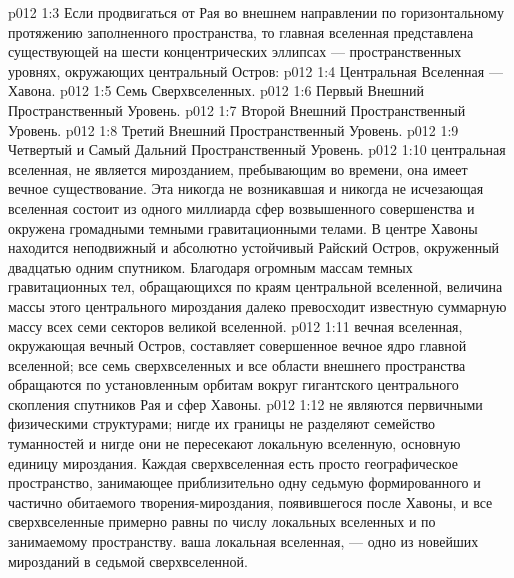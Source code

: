 \vs p012 1:3 \pc Если продвигаться от Рая во внешнем направлении по горизонтальному протяжению заполненного пространства, то главная вселенная представлена существующей на шести концентрических эллипсах --- пространственных уровнях, окружающих центральный Остров:
\vs p012 1:4 \bibnobreakspace Центральная Вселенная --- Хавона.
\vs p012 1:5 \bibnobreakspace Семь Сверхвселенных.
\vs p012 1:6 \bibnobreakspace Первый Внешний Пространственный Уровень.
\vs p012 1:7 \bibnobreakspace Второй Внешний Пространственный Уровень.
\vs p012 1:8 \bibnobreakspace Третий Внешний Пространственный Уровень.
\vs p012 1:9 \bibnobreakspace Четвертый и Самый Дальний Пространственный Уровень.
\vs p012 1:10 \pc {} центральная вселенная, не является мирозданием, пребывающим во времени, она имеет вечное существование. Эта никогда не возникавшая и никогда не исчезающая вселенная состоит из одного миллиарда сфер возвышенного совершенства и окружена громадными темными гравитационными телами. В центре Хавоны находится неподвижный и абсолютно устойчивый Райский Остров, окруженный двадцатью одним спутником. Благодаря огромным массам темных гравитационных тел, обращающихся по краям центральной вселенной, величина массы этого центрального мироздания далеко превосходит известную суммарную массу всех семи секторов великой вселенной.
\vs p012 1:11 \pc {} вечная вселенная, окружающая вечный Остров, составляет совершенное вечное ядро главной вселенной; все семь сверхвселенных и все области внешнего пространства обращаются по установленным орбитам вокруг гигантского центрального скопления спутников Рая и сфер Хавоны.
\vs p012 1:12  не являются первичными физическими структурами; нигде их границы не разделяют семейство туманностей и нигде они не пересекают локальную вселенную, основную единицу мироздания. Каждая сверхвселенная есть просто географическое пространство, занимающее приблизительно одну седьмую формированного и частично обитаемого творения\hyp{}мироздания, появившегося после Хавоны, и все сверхвселенные примерно равны по числу локальных вселенных и по занимаемому пространству.  ваша локальная вселенная, --- одно из новейших мирозданий в  седьмой сверхвселенной.
